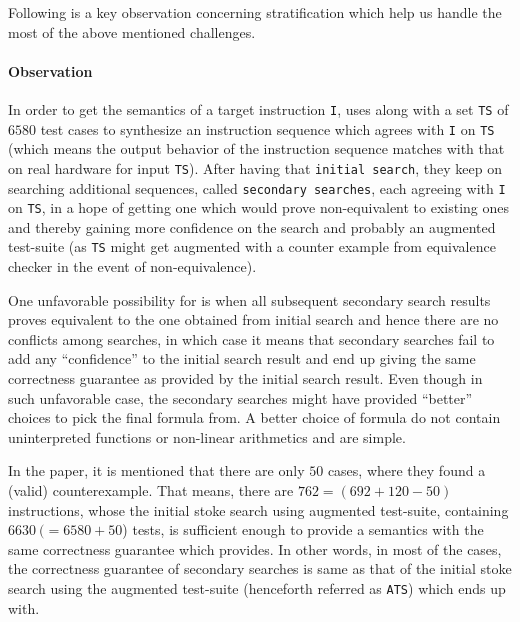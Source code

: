 Following is a key observation concerning stratification which help us handle
the most of the above mentioned challenges.

\paragraph{Observation} In order to get the semantics of a target instruction
{\tt I}, \Strata uses \Stoke along with a set {\tt TS} of $6580$ test cases to
synthesize an instruction sequence which agrees with {\tt I} on {\tt TS} (which
    means the output behavior of the instruction sequence matches with that on
    real hardware for input {\tt TS}). After having that {\tt initial search},
           they keep on searching  additional sequences, called {\tt secondary
             searches}, each agreeing with {\tt I} on {\tt TS}, in a hope of
             getting  one which would prove non-equivalent to existing ones and
             thereby gaining more confidence on the search and probably an
             augmented test-suite (as {\tt TS} might get augmented with a
                 counter example from equivalence checker in the event of
                 non-equivalence). 
      
      One unfavorable possibility for \Strata is when all subsequent secondary
      search results proves  equivalent to the one obtained from initial search
      and hence there are no conflicts among searches, in which case it  means
      that  secondary searches fail to add any ``confidence'' to the initial
      search result and end up giving the same correctness guarantee as provided
      by the initial search result. Even though in such unfavorable case, the
      secondary searches might have provided ``better'' choices to pick the
      final formula from. A better choice of formula do not contain
      uninterpreted functions or  non-linear arithmetics and are simple.  
    
   In the paper\cite{Heule2016a}, it is mentioned that there are only $50$
   cases, where they found a (valid) counterexample. That means, there are $762
   = (692 + 120 - 50)$ instructions, whose the initial stoke search using
   augmented test-suite, containing $6630\ (= 6580 + 50$) tests,  is sufficient
   enough to provide a semantics with the same correctness guarantee which
   \Strata provides.   In other words, in  most of the cases, the correctness
   guarantee of secondary searches is same as that of the initial stoke search
   using the augmented test-suite (henceforth referred as {\tt ATS})  which
   \Strata ends up with.
      
